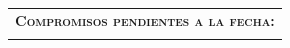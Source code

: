 \documentclass[12pt]{report}
\begin{document}
\vspace{0.3 cm}

\begin{minipage}{\textwidth}
	\begin{tabular}{l}
		\begin{minipage}[t]{\textwidth}%
			\cellcolor{blue!10}\textsc{\textbf{Compromisos pendientes a la fecha:}}
		\end{minipage}
		\vspace{0.1cm}\\
		\begin{minipage}[t]{\textwidth}%
			\cellcolor{white!10}{ act-pen-proy }
		\end{minipage}
	\end{tabular}	
\end{minipage}
\end{document}
